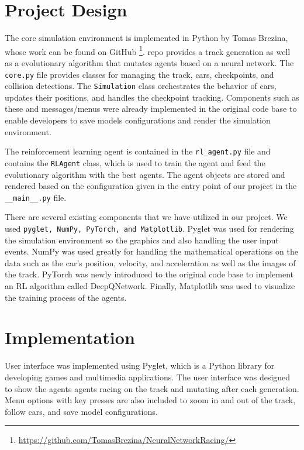 \documentclass[12pt]{article}
\begin{document}
\section{Project Design}

The core simulation environment is implemented in Python by Tomas Brezina, whose 
work can be found on GitHub
\footnote{\url{https://github.com/TomasBrezina/NeuralNetworkRacing/}}.
repo provides a track generation as well as a evolutionary algorithm that mutates 
agents based on a neural network. The \texttt{core.py} file provides classes for 
managing the track, cars, checkpoints, and collision detections. The 
\texttt{Simulation} class orchestrates the behavior of cars, updates their 
positions, and handles the checkpoint tracking. Components such as these and 
messages/menus were already implemented in the original code base to enable 
developers to save models configurations and render the simulation environment.

The reinforcement learning agent is contained in the \texttt{rl\_agent.py} file 
and contains the \texttt{RLAgent} class, which is used to train the agent and 
feed the evolutionary algorithm with the best agents. The agent objects are 
stored and rendered based on the configuration given in the entry point of our 
project in the \texttt{\_\_main\_\_.py} file.

There are several existing components that we have utilized in our project. We 
used \texttt{pyglet, NumPy, PyTorch, and Matplotlib}. Pyglet was used for 
rendering the simulation environment so the graphics and also handling the user 
input events. NumPy was used greatly for handling the mathematical operations 
on the data such as the car's position, velocity, and acceleration as well as 
the images of the track. PyTorch was newly introduced to the original code base 
to implement an RL algorithm called DeepQNetwork. Finally, Matplotlib was used 
to visualize the training process of the agents.

\section{Implementation}

User interface was implemented using Pyglet, which is a Python library for
developing games and multimedia applications. The user interface was designed to 
show the agents agents racing on the track and mutating after each generation. 
Menu options with key presses are also included to zoom in and out of the track, 
follow cars, and save model configurations.
\end{document}
